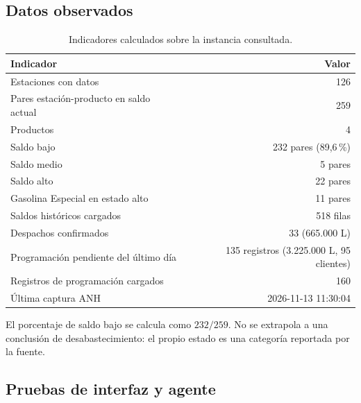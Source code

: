 \documentclass[12pt,a4paper]{article}
\begin{document}
\subsection{Datos observados}

\begin{table}[H]
\centering
\small
\caption{Indicadores calculados sobre la instancia consultada.}
\label{tab:resultados}
\begin{tabular}{@{}lr@{}}
\toprule
\textbf{Indicador} & \textbf{Valor} \\
\midrule
Estaciones con datos & 126 \\
Pares estación-producto en saldo actual & 259 \\
Productos & 4 \\
Saldo bajo & 232 pares (89,6\,\%) \\
Saldo medio & 5 pares \\
Saldo alto & 22 pares \\
Gasolina Especial en estado alto & 11 pares \\
Saldos históricos cargados & 518 filas \\
Despachos confirmados & 33 (665.000 L) \\
Programación pendiente del último día & 135 registros (3.225.000 L, 95 clientes) \\
Registros de programación cargados & 160 \\
Última captura ANH & 2026-11-13 11:30:04 \\
\bottomrule
\end{tabular}
\end{table}

El porcentaje de saldo bajo se calcula como \(232/259\). No se extrapola a una conclusión de desabastecimiento: el propio estado es una categoría reportada por la fuente.

\subsection{Pruebas de interfaz y agente}
\end{document}
